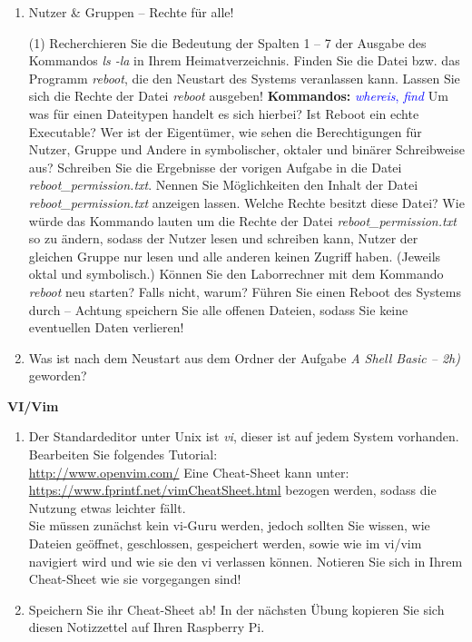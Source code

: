 \documentclass[paper=a4,fontsize=11pt]{scrartcl}%
\numberwithin{equation}{section}
\begin{document}
{\begin{enumerate}
\item Nutzer \& Gruppen -- Rechte für alle!
	\begin{tasks}(1)
        \task Recherchieren Sie die Bedeutung der Spalten 1 -- 7 der Ausgabe des Kommandos \emph{ls -la} in Ihrem Heimatverzeichnis.
        \task Finden Sie die Datei bzw. das Programm \textit{reboot}, die den Neustart des Systems veranlassen kann. Lassen Sie sich die Rechte der Datei \textit{reboot} ausgeben!
        \textbf{Kommandos:} \textcolor{blue}{\emph{whereis}, \emph{find}}
        \task Um was für einen Dateitypen handelt es sich hierbei? Ist Reboot ein echte Executable?
        \task Wer ist der Eigentümer, wie sehen die Berechtigungen für Nutzer, Gruppe und Andere in symbolischer, oktaler und binärer Schreibweise aus?
        \task Schreiben Sie die Ergebnisse der vorigen Aufgabe in die Datei \textit{reboot\-\_permission.txt}.
        \task Nennen Sie Möglichkeiten den Inhalt der Datei \textit{reboot\-\_permission.txt} anzeigen lassen. Welche Rechte besitzt diese Datei?
        \task Wie würde das Kommando lauten um die Rechte der Datei \textit{reboot\-\_permission.txt} so zu ändern, sodass der Nutzer lesen und schreiben kann, Nutzer der gleichen Gruppe nur lesen und alle anderen keinen Zugriff haben. (Jeweils oktal und symbolisch.) 
        \task Können Sie den Laborrechner mit dem Kommando \textit{reboot} neu starten? Falls nicht, warum? 
        \task Führen Sie einen Reboot des Systems durch -- Achtung speichern Sie alle offenen Dateien, sodass Sie keine eventuellen Daten verlieren!
  \end{tasks}
  \item Was ist nach dem Neustart aus dem Ordner der Aufgabe \emph{A Shell Basic -- 2h)} geworden?
\end{enumerate}
\begin{center}\Large{\textbf{VI/Vim}}\end{center}\vskip0.25in
\begin{enumerate}
	\item Der Standardeditor unter Unix ist \emph{vi}, dieser ist auf jedem System vorhanden. Bearbeiten Sie folgendes Tutorial:\\
	\url{http://www.openvim.com/}
	Eine Cheat-Sheet kann unter: \url{https://www.fprintf.net/vimCheatSheet.html} bezogen werden, sodass die Nutzung etwas leichter fällt.\\
	Sie müssen zunächst kein vi-Guru werden, jedoch sollten Sie wissen, wie Dateien geöffnet, geschlossen, gespeichert werden, sowie wie im vi/vim navigiert wird und wie sie den vi verlassen können. Notieren Sie sich in Ihrem Cheat-Sheet wie sie vorgegangen sind!
	\item Speichern Sie ihr Cheat-Sheet ab! In der nächsten Übung kopieren Sie sich diesen Notizzettel auf Ihren Raspberry Pi.
\end{enumerate}

}
\end{document}

